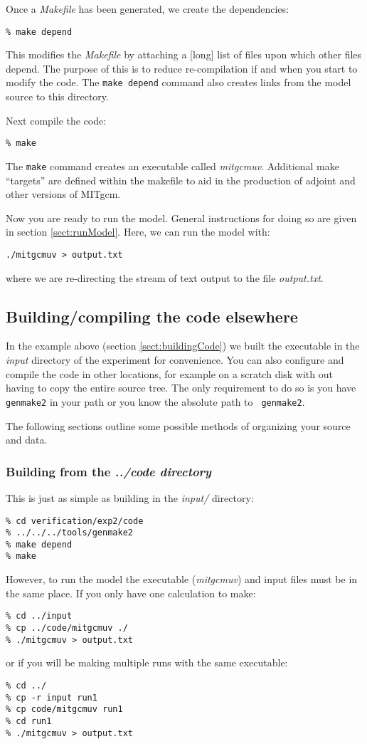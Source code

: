 Once a {\em Makefile} has been generated, we create the dependencies:
\begin{verbatim}
% make depend
\end{verbatim}
This modifies the {\em Makefile} by attaching a [long] list of files
upon which other files depend. The purpose of this is to reduce
re-compilation if and when you start to modify the code. The {\tt make
  depend} command also creates links from the model source to this
directory.

Next compile the code:
\begin{verbatim}
% make
\end{verbatim}
The {\tt make} command creates an executable called \textit{mitgcmuv}.
Additional make ``targets'' are defined within the makefile to aid in
the production of adjoint and other versions of MITgcm.

Now you are ready to run the model. General instructions for doing so are
given in section \ref{sect:runModel}. Here, we can run the model with:
\begin{verbatim}
./mitgcmuv > output.txt
\end{verbatim}
where we are re-directing the stream of text output to the file {\em
output.txt}.


\subsection{Building/compiling the code elsewhere}

In the example above (section \ref{sect:buildingCode}) we built the
executable in the {\em input} directory of the experiment for
convenience. You can also configure and compile the code in other
locations, for example on a scratch disk with out having to copy the
entire source tree. The only requirement to do so is you have {\tt
  genmake2} in your path or you know the absolute path to {\tt
  genmake2}.

The following sections outline some possible methods of organizing
your source and data.

\subsubsection{Building from the {\em ../code directory}}

This is just as simple as building in the {\em input/} directory:
\begin{verbatim}
% cd verification/exp2/code
% ../../../tools/genmake2
% make depend
% make
\end{verbatim}
However, to run the model the executable ({\em mitgcmuv}) and input
files must be in the same place. If you only have one calculation to make:
\begin{verbatim}
% cd ../input
% cp ../code/mitgcmuv ./
% ./mitgcmuv > output.txt
\end{verbatim}
or if you will be making multiple runs with the same executable:
\begin{verbatim}
% cd ../
% cp -r input run1
% cp code/mitgcmuv run1
% cd run1
% ./mitgcmuv > output.txt
\end{verbatim}

